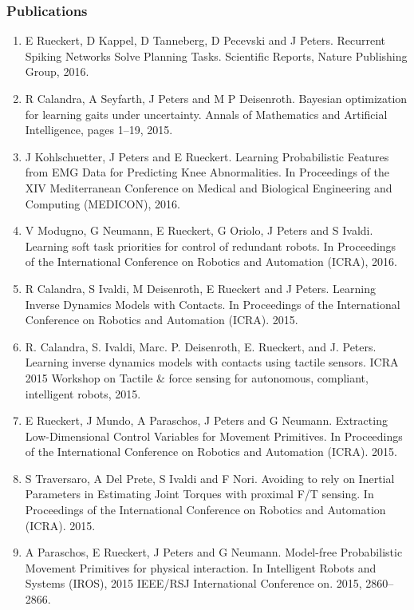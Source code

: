 \subsubsection{Publications}

\begin{enumerate}
\item E Rueckert, D Kappel, D Tanneberg, D Pecevski and J Peters. Recurrent Spiking Networks Solve Planning Tasks. Scientific Reports, Nature Publishing Group, 2016.
\item R Calandra, A Seyfarth, J Peters and M P Deisenroth. Bayesian optimization for learning gaits under uncertainty. Annals of Mathematics and Artificial Intelligence, pages 1–19, 2015.
\item J Kohlschuetter, J Peters and E Rueckert. Learning Probabilistic Features from EMG Data for Predicting Knee Abnormalities. In Proceedings of the XIV Mediterranean Conference on Medical and Biological Engineering and Computing (MEDICON), 2016.
\item V Modugno, G Neumann, E Rueckert, G Oriolo, J Peters and S Ivaldi. Learning soft task priorities for control of redundant robots. In Proceedings of the International Conference on Robotics and Automation (ICRA), 2016.
\item R Calandra, S Ivaldi, M Deisenroth, E Rueckert and J Peters. Learning Inverse Dynamics Models with Contacts. In Proceedings of the International Conference on Robotics and Automation (ICRA). 2015.
\item R. Calandra, S. Ivaldi, Marc. P. Deisenroth, E. Rueckert, and J. Peters. Learning inverse dynamics models with contacts using tactile sensors. ICRA 2015 Workshop on Tactile \& force sensing for autonomous, compliant, intelligent robots, 2015.
\item E Rueckert, J Mundo, A Paraschos, J Peters and G Neumann. Extracting Low-Dimensional Control Variables for Movement Primitives. In Proceedings of the International Conference on Robotics and Automation (ICRA). 2015. 
\item S Traversaro, A Del Prete, S Ivaldi and F Nori. Avoiding to rely on Inertial Parameters in Estimating Joint Torques with proximal F/T sensing. In Proceedings of the International Conference on Robotics and Automation (ICRA). 2015.
\item A Paraschos, E Rueckert, J Peters and G Neumann. Model-free Probabilistic Movement Primitives for physical interaction. In Intelligent Robots and Systems (IROS), 2015 IEEE/RSJ International Conference on. 2015, 2860–2866. 

\end{enumerate}
